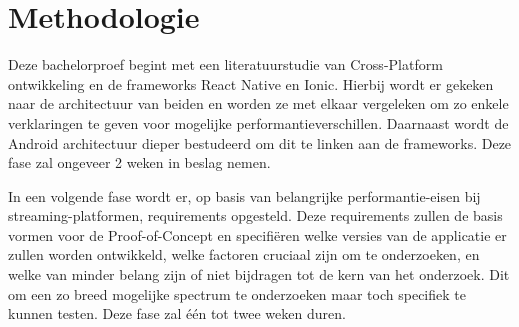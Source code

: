 




\section{Methodologie}%
\label{sec:methodologie}

Deze bachelorproef begint met een literatuurstudie van Cross-Platform ontwikkeling en de frameworks React Native en Ionic. Hierbij wordt er gekeken naar de architectuur van beiden en worden ze met elkaar vergeleken om zo enkele verklaringen te geven voor mogelijke performantieverschillen. Daarnaast wordt de Android architectuur dieper bestudeerd om dit te linken aan de frameworks. Deze fase zal ongeveer 2 weken in beslag nemen.

In een volgende fase wordt er, op basis van belangrijke performantie-eisen bij streaming-platformen, requirements opgesteld. Deze requirements zullen de basis vormen voor de Proof-of-Concept en specifiëren welke versies van de applicatie er zullen worden ontwikkeld, welke factoren cruciaal zijn om te onderzoeken, en welke van minder belang zijn of niet bijdragen tot de kern van het onderzoek. Dit om een zo breed mogelijke spectrum te onderzoeken maar toch specifiek te kunnen testen. Deze fase zal één tot twee weken duren.

